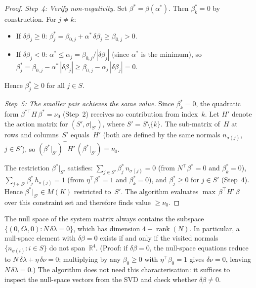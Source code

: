 \begin{proof}
\emph{Step~4: Verify non-negativity.}
Set $\beta^* = \beta(\alpha^*)$.
Then $\beta^*_k = 0$ by construction.
For $j \neq k$:
\begin{itemize}
\item If $\delta\beta_j \geq 0$:
  $\beta^*_j = \beta_{0,j} + \alpha^*\,\delta\beta_j
    \geq \beta_{0,j} > 0$.
\item If $\delta\beta_j < 0$:
  $\alpha^* \leq \alpha_j = \beta_{0,j}/|\delta\beta_j|$
  (since $\alpha^*$ is the minimum), so
  $\beta^*_j
    = \beta_{0,j} - \alpha^*\,|\delta\beta_j|
    \geq \beta_{0,j} - \alpha_j\,|\delta\beta_j| = 0$.
\end{itemize}
Hence $\beta^*_j \geq 0$ for all $j \in S$.

\emph{Step~5: The smaller pair achieves the same value.}
Since $\beta^*_k = 0$, the quadratic form
$\beta^{*\top} H\, \beta^* = \nu_0$ (Step~2)
receives no contribution from index~$k$.
Let $H'$ denote the action matrix for
$(S', \sigma|_{S'})$, where $S' = S \setminus \{k\}$.
The sub-matrix of~$H$ at rows and columns~$S'$
equals~$H'$ (both are defined by the same normals
$n_{\sigma(j)}$, $j \in S'$), so
$(\beta^*|_{S'})^\top H'\, (\beta^*|_{S'}) = \nu_0$.

The restriction $\beta^*|_{S'}$ satisfies:
$\sum_{j \in S'} \beta^*_j\, n_{\sigma(j)} = 0$
(from $N^\top \beta^* = 0$ and $\beta^*_k = 0$),
$\sum_{j \in S'} \beta^*_j\, h_{\sigma(j)} = 1$
(from $\eta^\top \beta^* = 1$ and $\beta^*_k = 0$),
and $\beta^*_j \geq 0$ for $j \in S'$ (Step~4).
Hence $\beta^*|_{S'} \in M(K)$ restricted to~$S'$.
The algorithm evaluates
$\max\, \beta^\top H'\, \beta$ over this constraint set
and therefore finds value $\geq \nu_0$.
\end{proof}

\begin{remark}%
\label{rem:nullspace-geometry}
The null space of the system matrix always contains the subspace
$\{(0, \delta\lambda, 0) : N\,\delta\lambda = 0\}$, which has
dimension $4 - \operatorname{rank}(N)$.
In particular, a null-space element with $\delta\beta = 0$
exists if and only if the visited normals
$\{n_{\sigma(i)} : i \in S\}$ do not span~$\mathbb{R}^4$.
(Proof: if $\delta\beta = 0$, the null-space equations reduce to
$N\,\delta\lambda + \eta\,\delta\nu = 0$; multiplying by any
$\beta_0 \geq 0$ with $\eta^\top\!\beta_0 = 1$ gives $\delta\nu = 0$,
leaving $N\,\delta\lambda = 0$.)
The algorithm does not need this characterisation: it suffices
to inspect the null-space vectors from the SVD and check whether
$\delta\beta \neq 0$.
\end{remark}

